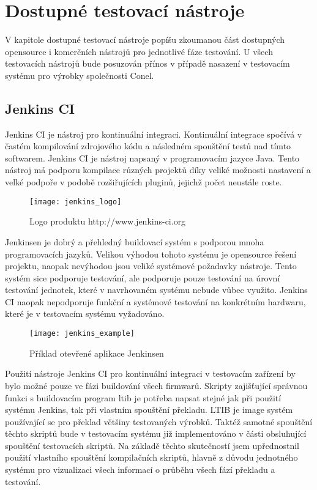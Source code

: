 \chapter{Dostupné testovací nástroje}
V kapitole dostupné testovací nástroje popíšu zkoumanou část dostupných opensource i komerčních nástrojů pro jednotlivé fáze testování. U všech testovacích nástrojů bude posuzován přínos v případě nasazení v testovacím systému pro výrobky společnosti Conel.

\section{Jenkins CI}
Jenkins CI je nástroj pro kontinuální integraci. Kontinuální integrace spočívá v častém kompilování zdrojového kódu a následném spouštění testů nad tímto softwarem.
Jenkins CI je nástroj napsaný v programovacím jazyce Java. Tento nástroj má podporu  kompilace různých projektů díky veliké možnosti nastavení a velké podpoře v podobě rozšiřujících pluginů, jejichž počet neustále roste.

\begin{figure}[h]
  \centering
  \texttt{[image: jenkins\_logo]}
  \caption{Logo produktu http://www.jenkins-ci.org}
  \label{fig:testlink_logo}
\end{figure}

Jenkinsen je dobrý a přehledný buildovací systém s podporou mnoha programovacích jazyků. Velikou výhodou tohoto systému je opensource řešení projektu, naopak nevýhodou jsou veliké systémové požadavky nástroje. Tento systém sice podporuje testování, ale podporuje pouze testování na úrovní testování jednotek, které v navrhovaném systému nebude vůbec využito. Jenkins CI naopak nepodporuje funkční a systémové testování na konkrétním hardwaru, které je v testovacím systému vyžadováno.

\begin{figure}[h]
  \centering
  \texttt{[image: jenkins\_example]}
  \caption{Příklad otevřené aplikace Jenkinsen}
  \label{fig:testlink_example}
\end{figure}

Použití nástroje Jenkins CI pro kontinuální integraci v testovacím zařízení by bylo možné pouze ve fázi buildování všech firmwarů. Skripty zajišťující správnou funkci s buildovacím program ltib je potřeba napsat stejné jak při použití systému Jenkins, tak při vlastním spouštění překladu. LTIB je image systém používající se pro překlad většiny testovaných výrobků. Taktéž samotné spouštění těchto skriptů bude v testovacím systému již implementováno v části obsluhující spouštění testovacích skriptů. Na základě těchto skutečností jsem upřednostnil použití vlastního spouštění kompilačních skriptů, hlavně z důvodu jednotného systému pro vizualizaci všech informací o průběhu všech fází překladu a testování.

